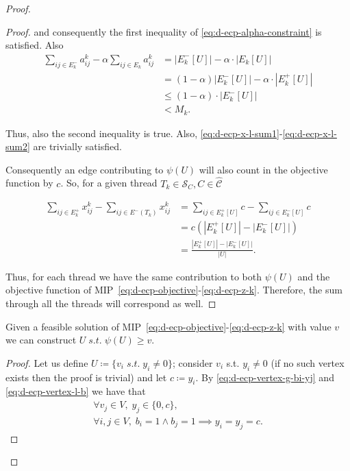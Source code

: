 \begin{proof}
\begin{proof}
		and consequently the first inequality of
		\eqref{eq:d-ecp-alpha-constraint} is satisfied. Also
		\begin{align}
			\sum^{}_{ij \in E^-_k} a_{ij}^{k}  - \alpha \sum^{}_{ij \in E_k}
			a_{ij} ^{k} & = |E^{-}_{k}[U]| - \alpha \cdot |E_{k}[U]|
			\\ & =
			(1- \alpha)|E^{-}_{k}[U]| - \alpha \cdot |E^{+}_{k}[U]|  \\
			            & \leq (1 -\alpha) \cdot |E^{-}_{k}[U]|      \\
			            & < M_k.
		\end{align}

		Thus, also the second inequality is true. Also,
		\eqref{eq:d-ecp-x-l-sum1}-\eqref{eq:d-ecp-x-l-sum2} are trivially
		satisfied.

		\bigskip
		Consequently an edge contributing to $\psi(U)$ will also count in the
		objective function by $c$. So, for a given thread $T_k \in \mathcal{S}_C, C \in \mathcal{\hat{C}}$

		\begin{align*}
			\sum^{}_{ij \in E^+_k} x_{ij} ^{k} - \sum_{ij \in E^{-}
			(T_{k})} x_{ij} ^{k} & = \sum^{}_{ij \in E^{+}_k[U] } c - \sum_{ij \in E^{-}
			_k[U]} c                                                                     \\
			                     & = c (|E^{+}_{k}[U]| - |E^{-}_{k}[U]|)                 \\
			                     & = \frac{|E^{+}_{k}[U]| -
			|E^{-}_{k}[U]|}{|U|}.
		\end{align*}

		Thus, for each thread we have the same contribution to both $\psi(U)$
		and the objective function of
		MIP~\eqref{eq:d-ecp-objective}-\eqref{eq:d-ecp-z-k}. Therefore, the sum through
		all the threads will correspond as well.
	\end{proof}

	\begin{claim}
		Given a feasible solution of
		MIP~\eqref{eq:d-ecp-objective}-\eqref{eq:d-ecp-z-k} with value $v$ we can
		construct $U \; s.t. \; \psi(U) \geq v$.
	\end{claim}

	\begin{proof}

		Let us define $U \coloneqq \{ v_i \; s.t. \; y_i \neq 0\}$; consider
		$v_i$ s.t. $y_i \neq 0$ (if no such vertex exists then the proof is
		trivial) and let $c \coloneqq y_i$. By
		\eqref{eq:d-ecp-vertex-g-bi-yj} and \eqref{eq:d-ecp-vertex-l-b}
		we have that
		\begin{gather}
			\label{eq:d-ecpp-y-in}
			\forall v_j \in V, \; y_j \in \{ 0, c\}, \\
			\forall i, j \in V, \; b_i = 1 \land b_j = 1 \implies y_i = y_j =
			c.
		\end{gather}


\end{proof}
\end{proof}
